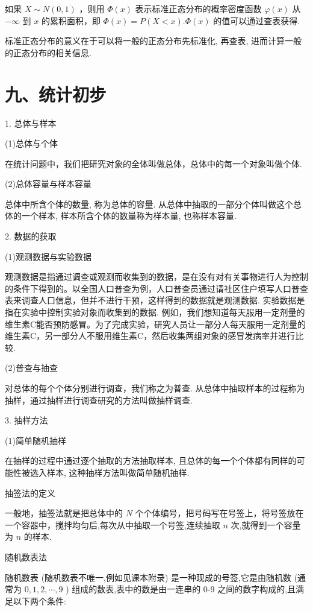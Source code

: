   如果 $X \sim  N\left( {0,1}\right)$ ，则用 $\Phi \left( x\right)$ 表示标准正态分布的概率密度函数 $\varphi \left( x\right)$ 从 $- \infty$ 到 $x$ 的累积面积，即 $\Phi \left( x\right)  = P\left( {X < x}\right) .\Phi \left( x\right)$ 的值可以通过查表获得.

标准正态分布的意义在于可以将一般的正态分布先标准化, 再查表, 进而计算一般的正态分布的相关信息.

\section*{九、统计初步}

1. 总体与样本

(1)总体与个体

在统计问题中，我们把研究对象的全体叫做总体，总体中的每一个对象叫做个体.

(2)总体容量与样本容量

总体中所含个体的数量, 称为总体的容量. 从总体中抽取的一部分个体叫做这个总体的一个样本, 样本所含个体的数量称为样本量, 也称样本容量.

2. 数据的获取

(1)观测数据与实验数据

观测数据是指通过调查或观测而收集到的数据，是在没有对有关事物进行人为控制的条件下得到的。以全国人口普查为例，人口普查员通过请社区住户填写人口普查表来调查人口信息，但并不进行干预，这样得到的数据就是观测数据. 实验数据是指在实验中控制实验对象而收集到的数据. 例如，我们想知道每天服用一定剂量的维生素C能否预防感冒。为了完成实验，研究人员让一部分人每天服用一定剂量的维生素C，另一部分人不服用维生素C，然后收集两组对象的感冒发病率并进行比较.

(2)普查与抽查

对总体的每个个体分别进行调查，我们称之为普查. 从总体中抽取样本的过程称为抽样，通过抽样进行调查研究的方法叫做抽样调查.

3. 抽样方法

(1)简单随机抽样

在抽样的过程中通过逐个抽取的方法抽取样本, 且总体的每一个个体都有同样的可能性被选入样本, 这种抽样方法叫做简单随机抽样.

  抽签法的定义

一般地，抽签法就是把总体中的 $N$ 个个体编号，把号码写在号签上，将号签放在一个容器中，搅拌均匀后,每次从中抽取一个号签,连续抽取 $n$ 次,就得到一个容量为 $n$ 的样本.

  随机数表法

随机数表 (随机数表不唯一,例如见课本附录) 是一种现成的号签,它是由随机数 (通常为 $0,1,2,\cdots ,9$ ) 组成的数表,表中的数是由一连串的 0-9 之间的数字构成的,且满足以下两个条件:


